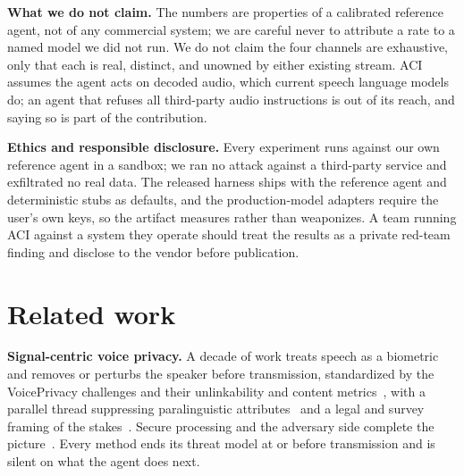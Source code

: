 \documentclass{Interspeech}
\newcommand{\aci}{\textsc{ACI}\xspace}
\begin{document}
\noindent\textbf{What we do not claim.} The numbers are properties of a calibrated reference agent, not of any commercial system; we are careful never to attribute a rate to a named model we did not run. We do not claim the four channels are exhaustive, only that each is real, distinct, and unowned by either existing stream. \aci assumes the agent acts on decoded audio, which current speech language models do; an agent that refuses all third-party audio instructions is out of its reach, and saying so is part of the contribution.

\noindent\textbf{Ethics and responsible disclosure.} Every experiment runs against our own reference agent in a sandbox; we ran no attack against a third-party service and exfiltrated no real data. The released harness ships with the reference agent and deterministic stubs as defaults, and the production-model adapters require the user's own keys, so the artifact measures rather than weaponizes. A team running \aci against a system they operate should treat the results as a private red-team finding and disclose to the vendor before publication.

\section{Related work}
\label{sec:related}
\noindent\textbf{Signal-centric voice privacy.} A decade of work treats speech as a biometric and removes or perturbs the speaker before transmission, standardized by the VoicePrivacy challenges and their unlinkability and content metrics~\cite{tomashenko2020initiative,tomashenko2022vp2020,tomashenko2024vp2022,fang2019xvector,srivastava2020design,srivastava2022xvector,champion2022disentangled,miao2023ohnn,meyer2022gan,patino2021mcadams,mawalim2022pitch,shamsabadi2023dpsa,maouche2022slicing}, with a parallel thread suppressing paralinguistic attributes~\cite{pathak2013privacy,jaiswal2020privacy,stoidis2021protecting} and a legal and survey framing of the stakes~\cite{nautsch2019csl,nautsch2019gdpr,srivastava2019reality}. Secure processing and the adversary side complete the picture~\cite{brasser2018voiceguard,qian2018infocom,han2020voiceindist,ahmed2020preech,deng2023vcloak,qian2018hidebehind,chen2021bob,li2020advpulse,vaidya2019talk}. Every method ends its threat model at or before transmission and is silent on what the agent does next.
\end{document}
